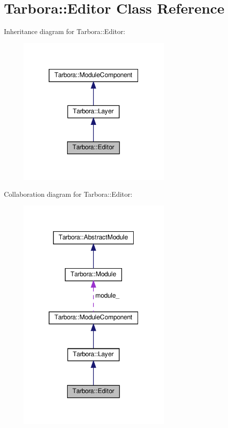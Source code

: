 \hypertarget{classTarbora_1_1Editor}{}\section{Tarbora\+:\+:Editor Class Reference}
\label{classTarbora_1_1Editor}


Inheritance diagram for Tarbora\+:\+:Editor\+:\nopagebreak
\begin{figure}[H]
\begin{center}
\leavevmode
\includegraphics[width=217pt]{classTarbora_1_1Editor__inherit__graph}
\end{center}
\end{figure}


Collaboration diagram for Tarbora\+:\+:Editor\+:\nopagebreak
\begin{figure}[H]
\begin{center}
\leavevmode
\includegraphics[width=217pt]{classTarbora_1_1Editor__coll__graph}
\end{center}
\end{figure}
